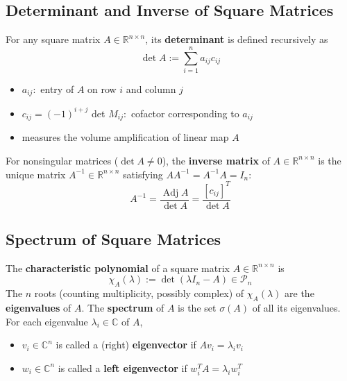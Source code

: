 \documentclass[10pt,a4paper,oneside]{article}
\begin{document}
\subsection{Determinant and Inverse of Square Matrices}
For any square matrix $A\in\mathbb{R}^{n\times n}$, its \textbf{determinant} is defined recursively as
\[
\operatorname{det} A :=\sum_{i=1}^{n} a_{i j} c_{i j}
\]
\begin{itemize}
\item $a_{i j} :$ entry of $A$ on row $i$ and column $j$
\item $c_{i j}=(-1)^{i+j}$ det $M_{i j} :$ cofactor corresponding to $a_{i j}$
\item measures the volume amplification of linear map $A$
\end{itemize}
For nonsingular matrices ($\det A\neq0$), the {\bfseries inverse matrix} of $A\in\mathbb{R}^{n\times n}$ is the unique matrix $A^{-1}\in\mathbb{R}^{n\times n}$ satisfying $AA^{-1}=A^{-1}A=I_n$:
\[
A^{-1}=\frac{\operatorname{Adj} A}{\operatorname{det} A}=\frac{\left[c_{i j}\right]^{T}}{\operatorname{det} A}
\]

\subsection{Spectrum of Square Matrices}
The \textbf{characteristic polynomial} of a square matrix $A \in \mathbb{R}^{n \times n}$ is
\[
\chi_{A}(\lambda) :=\operatorname{det}\left(\lambda I_{n}-A\right) \in \mathcal{P}_{n}
\]
The $n$ roots (counting multiplicity, possibly complex) of $\chi_{A}(\lambda)$ are the \textbf{eigenvalues} of $A$. The {\bfseries spectrum} of $A$ is the set $\sigma(A)$ of all its eigenvalues. For each eigenvalue $\lambda_i\in\mathbb{C}$ of $A$,
\begin{itemize}
\item $v_{i} \in \mathbb{C}^{n}$ is called a (right) \textbf{eigenvector} if $A v_{i}=\lambda_{i} v_{i}$
\item $w_{i} \in \mathbb{C}^{n}$ is called a \textbf{left eigenvector} if $w_{i}^{T} A=\lambda_{i} w_{i}^{T}$
\end{itemize}
\end{document}
